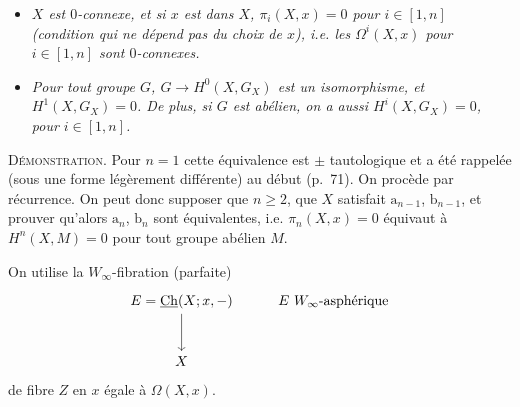 \begin{itemize}
\item[\textit{$a_n$)}] \textit{$X$ est $0$-connexe, et si $x$ est dans $X$, $\pi_i(X,x) = 0$ pour $i \in [1,n]$ (condition qui ne dépend pas du choix de $x$), i.e. les $\Omega^i(X,x)$ pour $i \in [1,n]$ sont $0$-connexes.}
\item[\textit{$b_n$)}] \textit{Pour tout groupe $G$, $G \longrightarrow H^0(X,G_X)$ est un isomorphisme, et $H^1(X,G_X) = 0$. De plus, si $G$ est abélien, on a aussi $H^i(X,G_X) = 0$, pour $i \in [1,n]$.}
\end{itemize}

\textsc{Démonstration}. Pour $n = 1$ cette équivalence est $\pm$ tautologique et a été rappelée (sous une forme légèrement différente) au début (p.~71). On procède par récurrence. On peut donc supposer que $n \geq 2$, que $X$ satisfait $\mathrm{a}_{n-1}$, $\mathrm{b}_{n-1}$, et prouver qu'alors $\mathrm{a}_n$, $\mathrm{b}_n$ sont équivalentes, i.e. $\pi_n(X,x) = 0$ équivaut à $H^n(X,M) = 0$ pour tout groupe abélien $M$.

On utilise la $W_\infty$-fibration (parfaite)
\[
\begin{tikzcd}[row sep=large]
E = \Ch(X;x,-) \arrow[d] & E\ W_\infty\text{-asphérique} \\
X &
\end{tikzcd}
\]
de fibre $Z$ en $x$ égale à $\Omega(X,x)$.

